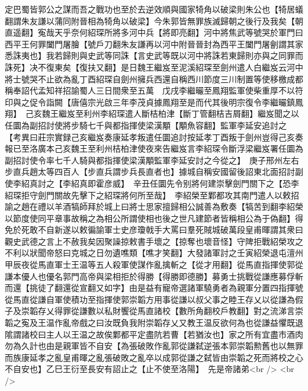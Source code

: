 定巴蜀皆郭公之謀而吾之戰功也至於去逆效順與國家犄角以破梁則朱公也【犄居蟻翻謂朱友謙以蒲同附晉相為犄角以破梁】今朱郭皆無罪族滅歸朝之後行及我矣【朝直遥翻】寃哉天乎奈何紹琛所將多河中兵【將即亮翻】河中將焦武等號哭於軍門曰西平王何罪闔門屠膾【號戶刀翻朱友謙再以河中附晉晉封為西平王闔門屠劊謂其家悉誅夷也】我若歸則與史武等同誅【言史武等既以河中將誅若東歸則亦與之同罪而誅死】决不復東矣【復扶又翻】是日魏王繼岌至泥溪紹琛至劍州遣人白繼岌云河中將士號哭不止欲為亂丁酉紹琛自劍州擁兵西還自稱西川節度三川制置等使移檄成都稱奉詔代孟知祥招諭蜀人三日間衆至五萬　戊戌李繼曮至鳳翔監軍使柴重厚不以符印與之促令詣闕【唐僖宗光啟三年李茂貞據鳳翔至是而代其後明宗復令李繼曮鎮鳳翔】　己亥魏王繼岌至利州李紹琛遣人斷桔柏津【斷丁管翻桔吉屑翻】繼岌聞之以任圜為副招討使將步騎七千與都指揮使梁漢顒【顒魚容翻】監軍李延安追討之　【考異曰莊宗實録己亥繼岌奏康延孝叛遣任圜追討按延孝丁酉叛于劍州豈得己亥奏報已至洛廣本己亥魏王至利州桔柏津使夜來告繼岌言李紹琛令斷浮梁繼岌署任圜為副招討使令率七千人騎與都指揮使梁漢顒監軍李延安討之今從之】　庚子邢州左右步直兵趙太等四百人【步直兵謂步兵長直者也】據城自稱安國留後詔東北面招討副使李紹真討之【李紹真即霍彦威】　辛丑任圜先令别將何建崇擊劍門關下之【恐李紹琛拒守劍門關故先擊下之紹琛將何所至哉】　李紹榮至鄴都攻其南門遣人以敕招諭之趙在禮以羊酒犒師拜於城上曰將士思家擅歸相公誠善為敷奏【犒苦到翻李紹榮以節度使同平章事故稱之為相公所謂使相也後之世凡建節者皆稱相公為于偽翻】得免於死敢不自新遂以敕徧諭軍士史彦瓊戟手大罵曰羣死賊城破萬段皇甫暉謂其衆曰觀史武德之言上不赦我矣因聚譟掠敕書手壞之【掠奪也壞音怪】守陴拒戰紹榮攻之不利以狀聞帝怒曰克城之日勿遺噍類【噍才笑翻】大發諸軍討之壬寅紹榮退屯澶州　甲辰夜從馬直軍士王温等五人殺軍使謀作亂擒斬之【從才用翻】從馬直指揮使郭從謙本優人也優名郭門高帝與梁相拒於得勝【得勝即德勝】募勇士挑戰從謙應募俘斬而還【挑徒了翻還從宣翻又如字】由是益有寵帝選諸軍驍勇者為親軍分置四指揮號從馬直從謙自軍使積功至指揮使郭崇韜方用事從謙以叔父事之睦王存乂以從謙為假子及崇韜存乂得罪從謙數以私財饗從馬直諸校【數所角翻校戶教翻】對之流涕言崇韜之寃及王温作亂帝戲之曰汝既負我附崇韜存乂又教王温反欲何為也從謙益懼既退隂謂諸校曰主人以王温之故俟鄴都平定盡阬若曹【若猶汝也】家之所有宜盡市酒肉勿為久計也由是親軍皆不自安【為張破敗作亂郭從謙弑逆張本郭崇韜勲舊也以無罪而族康延孝之亂皇甫暉之亂張破敗之亂卒以成郭從謙之弑皆由崇韜之死而將校之心不自安也】乙巳王衍至長安有詔止之【止不使至洛陽】　先是帝諸弟<br />
<br />
